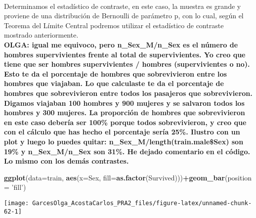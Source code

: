 \documentclass[
]{article}
\newenvironment{Shaded}{\begin{snugshade}}{\end{snugshade}}
\newcommand{\DataTypeTok}[1]{\textcolor[rgb]{0.13,0.29,0.53}{#1}}
\newcommand{\KeywordTok}[1]{\textcolor[rgb]{0.13,0.29,0.53}{\textbf{#1}}}
\newcommand{\NormalTok}[1]{#1}
\newcommand{\OperatorTok}[1]{\textcolor[rgb]{0.81,0.36,0.00}{\textbf{#1}}}
\newcommand{\StringTok}[1]{\textcolor[rgb]{0.31,0.60,0.02}{#1}}
\begin{document}
\texttt{} \texttt{}\\
Determinamos el estadístico de contraste, en este caso, la muestra es
grande y proviene de una distribución de Bernoulli de parámetro p, con
lo cual, según el Teorema del Límite Central podremos utilizar el
estadístico de contraste mostrado anteriormente.\\
\textbf{OLGA: igual me equivoco, pero n\_Sex\_M/n\_Sex es el número de
hombres supervivientes frente al total de supervivientes. Yo creo que
tiene que ser hombres supervivientes / hombres (supervivientes o no).
Esto te da el porcentaje de hombres que sobrevivieron entre los hombres
que viajaban. Lo que calculaste te da el porcentaje de hombres que
sobrevivieron entre todos los pasajeros que sobrevivieron. Digamos
viajaban 100 hombres y 900 mujeres y se salvaron todos los hombres y 300
mujeres. La proporción de hombres que sobrevivieron en este caso debería
ser 100\% porque todos sobrevivieron, y creo que con el cálculo que has
hecho el porcentaje sería 25\%. Ilustro con un plot y luego lo puedes
quitar: n\_Sex\_M/length(train.male\$Sex) son 19\% y n\_Sex\_M/n\_Sex
son 31\%. He dejado comentario en el código. Lo mismo con los demás
contrastes.} \texttt{}

\begin{Shaded}
\begin{Highlighting}[]
\KeywordTok{ggplot}\NormalTok{(}\DataTypeTok{data=}\NormalTok{train, }\KeywordTok{aes}\NormalTok{(}\DataTypeTok{x=}\NormalTok{Sex, }\DataTypeTok{fill=}\KeywordTok{as.factor}\NormalTok{(Survived)))}\OperatorTok{+}\KeywordTok{geom_bar}\NormalTok{(}\DataTypeTok{position =} \StringTok{'fill'}\NormalTok{)}
\end{Highlighting}
\end{Shaded}

\begin{center}\texttt{[image: GarcesOlga\_AcostaCarlos\_PRA2\_files/figure-latex/unnamed-chunk-62-1]} \end{center}
\end{document}
